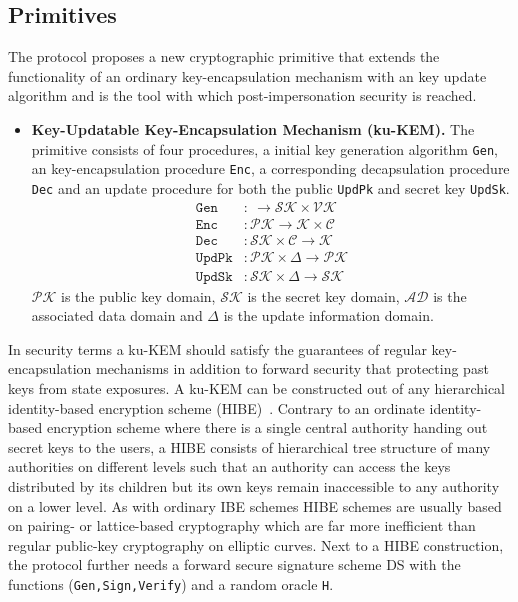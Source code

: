 \documentclass[11pt,a4paper,twoside,openright,bibliography=totoc]{scrbook}
\begin{document}
\subsection{Primitives}
\label{sec:primitives}

The protocol proposes a new cryptographic primitive that extends the
functionality of an ordinary key-encapsulation mechanism with an
key update algorithm and is the tool with which post-impersonation
security is reached.
\begin{itemize}
\item \textbf{Key-Updatable Key-Encapsulation Mechanism (ku-KEM).} The primitive
  consists of four procedures, a initial key generation algorithm \texttt{Gen}, an
  key-encapsulation procedure \texttt{Enc}, a corresponding decapsulation
  procedure \texttt{Dec} and
  an update procedure for both the public \texttt{UpdPk} and secret key \texttt{UpdSk}.
  \begin{align*}
    \texttt{Gen} & : \ \rightarrow \mathcal{SK} \times \mathcal{VK} \\
    \texttt{Enc} & : \mathcal{PK} \rightarrow \mathcal{K} \times \mathcal{C} \\ 
    \texttt{Dec} & : \mathcal{SK} \times \mathcal{C} \rightarrow \mathcal{K} \\
    \texttt{UpdPk} & : \mathcal{PK} \times \Delta \rightarrow \mathcal{PK} \\
    \texttt{UpdSk} & : \mathcal{SK} \times \Delta \rightarrow \mathcal{SK}
  \end{align*}
  $\mathcal{PK}$ is the public key domain, $\mathcal{SK}$ is the secret key domain,
  $\mathcal{AD}$ is the associated data domain and $\Delta$ is
  the update information domain.
\end{itemize}
In security terms a ku-KEM should satisfy the guarantees of regular
key-encapsulation mechanisms in addition to forward security that
protecting past keys from state exposures. A ku-KEM can be constructed
out of any hierarchical identity-based encryption scheme
(HIBE)~\cite{gentry2002hierarchical}. Contrary to an ordinate
identity-based encryption scheme where there is a single central
authority handing out secret keys to the users, a HIBE consists
of hierarchical tree structure of many authorities on different levels
such that an authority can access the keys distributed by its children
but its own keys remain inaccessible to any authority on a lower level.
As with ordinary IBE schemes HIBE schemes are usually based on pairing- or
lattice-based cryptography which are far more inefficient than
regular public-key cryptography on elliptic curves.
Next to a HIBE construction, the protocol further needs a forward secure
signature scheme DS with the functions (\texttt{Gen,Sign,Verify})
and a random oracle \texttt{H}.
\end{document}
